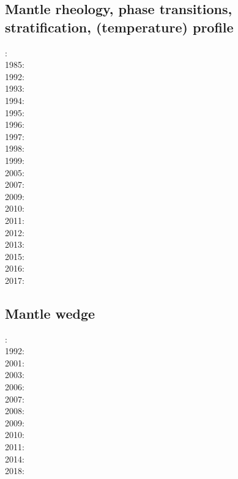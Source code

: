 \subsection*{Mantle rheology, phase transitions, stratification, (temperature) profile}

: \cite{yusb82}\cite{chri82}\\
1985: \cite{chyu85}\\
1992: \cite{zhyh92}\\
1993: \cite{tasg93}\cite{best93}\cite{kief93}\\
1994: \cite{vayv94}\cite{zhgu94b}\\
1995: \cite{zhyu95}\cite{chri95}\cite{scta95}\\
1996: \cite{pelt96}\cite{mitr96}\\
1997: \cite{mifo97}\\
1998: \cite{cava98}\\
1999: \cite{sigh99}\cite{kehv99}\\
2005: \cite{hett05}\\
2007: \cite{pazw07}\cite{mofm07}\cite{tanh07}\\
2009: \cite{natd09}\\
2010: \cite{kayy10}\\
2011: \cite{java11}\cite{faff11}\cite{nata11}\\
2012: \cite{tack12}\cite{sato12}\cite{natd12}\\
2013: \cite{fakc13}\cite{taab13}\\
2015: \cite{basn15}\\
2016: \cite{tiro16}\cite{beci16}\\
2017: \cite{vavs17}

\subsection*{Mantle wedge} 

: \cite{tosl78}\\
1992: \cite{dast92}\\
2001: \cite{bigu01}\cite{haki01}\\
2003: \cite{vank03}\\
2006: \cite{gogc06}\cite{gecy06}\\
2007: \cite{gogc07}\cite{knvk07}\cite{lohd07}\\
2008: \cite{knva08}\cite{cage08}\\
2009: \cite{leki09}\cite{heaa09}\\
2010: \cite{roms10}\cite{hogz10}\\
2011: \cite{zhgh11}\\
2014: \cite{ledg14}\cite{mabv14}\\
2018: \cite{pltv18}

